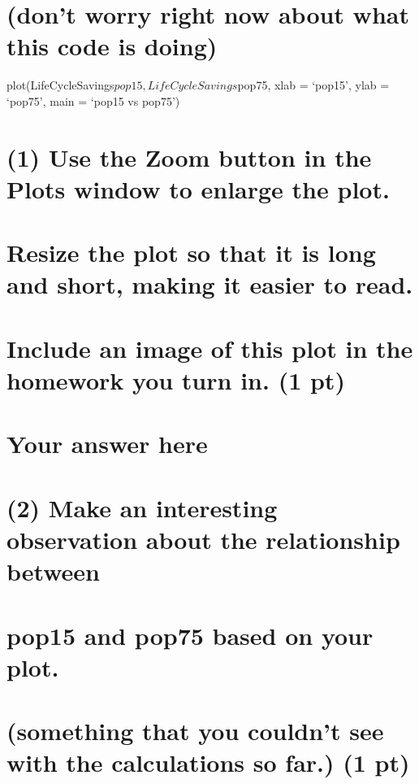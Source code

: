 \documentclass[]{article}
\begin{document}
\section{(don't worry right now about what this code is
doing)}\label{dont-worry-right-now-about-what-this-code-is-doing}

plot(LifeCycleSavings\(pop15, LifeCycleSavings\)pop75, xlab = `pop15',
ylab = `pop75', main = `pop15 vs pop75')

\section{(1) Use the Zoom button in the Plots window to enlarge the
plot.}\label{use-the-zoom-button-in-the-plots-window-to-enlarge-the-plot.}

\section{Resize the plot so that it is long and short, making it easier
to
read.}\label{resize-the-plot-so-that-it-is-long-and-short-making-it-easier-to-read.}

\section{Include an image of this plot in the homework you turn in. (1
pt)}\label{include-an-image-of-this-plot-in-the-homework-you-turn-in.-1-pt}

\section{Your answer here}\label{your-answer-here}

\section{(2) Make an interesting observation about the relationship
between}\label{make-an-interesting-observation-about-the-relationship-between}

\section{pop15 and pop75 based on your
plot.}\label{pop15-and-pop75-based-on-your-plot.}

\section{(something that you couldn't see with the calculations so far.)
(1
pt)}\label{something-that-you-couldnt-see-with-the-calculations-so-far.-1-pt}
\end{document}
